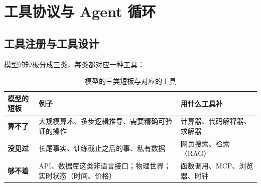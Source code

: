 \chapter{工具协议与 Agent 循环}

\section{工具注册与工具设计}
模型的短板分成三类，每类都对应一种工具：
\begin{table}[H]
\centering
\caption{模型的三类短板与对应的工具}
\label{tab:why-tools}
\begin{tabular}{p{2cm} p{7cm} p{6cm}}
  \toprule
  模型的短板 & 例子 & 用什么工具补 \\
  \midrule
  \textbf{算不了} & 大规模算术、多步逻辑推导、需要精确可验证的操作 & 计算器、代码解释器、求解器 \\
  \textbf{没见过} & 长尾事实、训练截止之后的事、私有数据 & 网页搜索、检索（RAG） \\
  \textbf{够不着} & API、数据库这类非语言接口；物理世界；实时状态（时间、价格） & 函数调用、MCP、浏览器、时钟 \\
  \bottomrule
\end{tabular}
\end{table}


